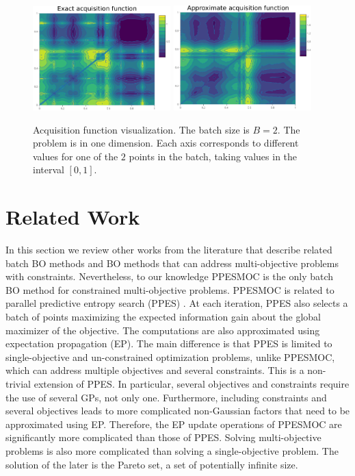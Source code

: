 \begin{figure}[ht]
\begin{center}
\includegraphics[width=0.475\textwidth]{Figures/exact_acq.pdf}
\includegraphics[width=0.475\textwidth]{Figures/ap_acq.pdf}
\caption{Acquisition function visualization. The batch size is $B=2$.
The problem is in one dimension. Each axis corresponds to different values for one
of the $2$ points in the batch, taking values in the interval $[0,1]$.}
\label{fig:exact_coupled_ppesmoc}
\end{center}
\end{figure}

\section{Related Work}\label{sec:related_work_ppesmoc}

In this section we review other works from the literature that describe related batch BO 
methods and BO methods that can address multi-objective problems with constraints.
Nevertheless, to our knowledge PPESMOC is the only batch BO method for constrained multi-objective 
problems. PPESMOC is related to parallel predictive entropy search (PPES) 
\citep{shah2015parallel}. At each iteration, PPES also selects a batch of points 
maximizing the expected information gain about the global maximizer of the objective. 
The computations are also approximated using expectation propagation (EP).
The main difference is that PPES is limited to single-objective and un-constrained
optimization problems, unlike PPESMOC, which can address multiple objectives and several 
constraints. This is a non-trivial extension of PPES. In particular, several objectives and constraints 
require the use of several GPs, not only one. Furthermore, including constraints and several
objectives leads to more complicated non-Gaussian factors that need to be approximated using
EP. Therefore, the EP update operations of PPESMOC are significantly more complicated than
those of PPES. Solving multi-objective problems is also more complicated than solving a 
single-objective problem. The solution of the later is the Pareto set, a set of potentially infinite size.

